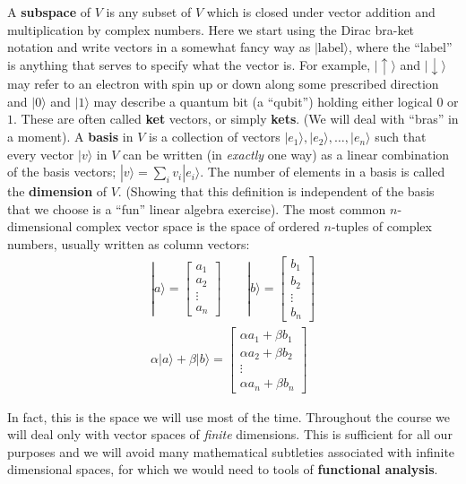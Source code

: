 \documentclass[fleqn]{article}
\begin{document}
A \textbf{subspace} of \(V\) is any subset of \(V\) which is closed under vector addition and multiplication by complex numbers.
Here we start using the Dirac bra-ket notation and write vectors in a somewhat fancy way as \(|\text{label}\rangle\), where the ``label'' is anything that serves to specify what the vector is.
For example, \(|\uparrow\rangle\) and \(|\downarrow\rangle\) may refer to an electron with spin up or down along some prescribed direction and \(|0\rangle\) and \(|1\rangle\) may describe a quantum bit (a ``qubit'') holding either logical \(0\) or \(1\).
These are often called \textbf{ket} vectors, or simply \textbf{kets}.
(We will deal with ``bras'' in a moment).
A \textbf{basis} in \(V\) is a collection of vectors \(|e_1\rangle,|e_2\rangle,\ldots,|e_n\rangle\) such that every vector \(|v\rangle\) in \(V\) can be written (in \emph{exactly} one way) as a linear combination of the basis vectors; \(|v\rangle=\sum_i v_i|e_i\rangle\).
The number of elements in a basis is called the \textbf{dimension} of \(V\).
(Showing that this definition is independent of the basis that we choose is a ``fun'' linear algebra exercise).
The most common \(n\)-dimensional complex vector space is the space of ordered \(n\)-tuples of complex numbers, usually written as column vectors:
\[
  \begin{gathered}
    |a\rangle
    = \begin{bmatrix}a_1\\a_2\\\vdots\\a_n\end{bmatrix}
    \qquad
    |b\rangle
    = \begin{bmatrix}b_1\\b_2\\\vdots\\b_n\end{bmatrix}
  \\\alpha|a\rangle+\beta|b\rangle
    = \begin{bmatrix}\alpha a_1+\beta b_1\\\alpha a_2+\beta b_2\\\vdots\\\alpha a_n+\beta b_n\end{bmatrix}
  \end{gathered}
\]

In fact, this is the space we will use most of the time.
Throughout the course we will deal only with vector spaces of \emph{finite} dimensions.
This is sufficient for all our purposes and we will avoid many mathematical subtleties associated with infinite dimensional spaces, for which we would need to tools of \textbf{functional analysis}.
\end{document}
